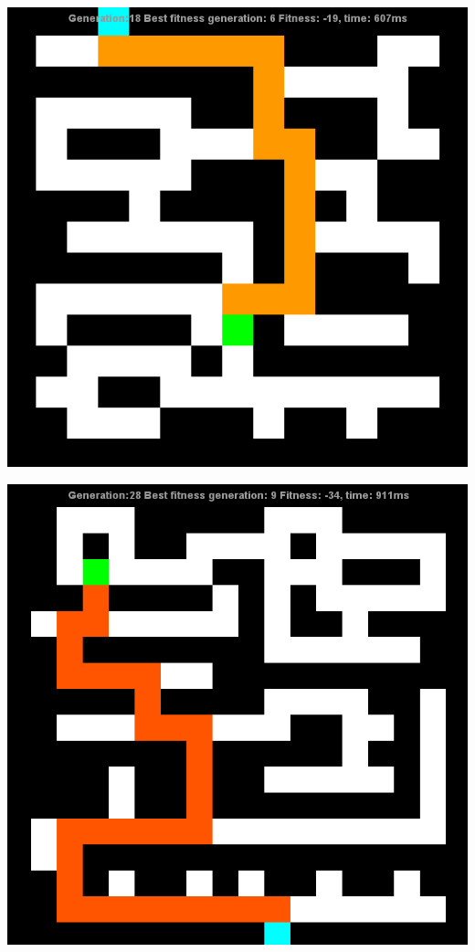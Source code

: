 \documentclass[12pt]{article} %
\begin{document}
\begin{center}
\includegraphics[scale=.6]{maze5}

\includegraphics[scale=.6]{maze6}


\end{center}
\end{document}
